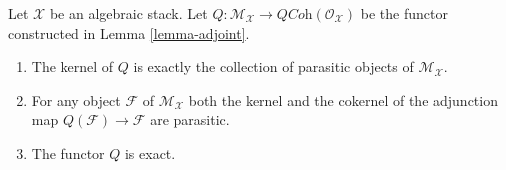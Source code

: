\begin{lemma}
\label{lemma-adjoint-kernel-parasitic}
Let $\mathcal{X}$ be an algebraic stack.
Let $Q : \mathcal{M}_\mathcal{X} \to \textit{QCoh}(\mathcal{O}_\mathcal{X})$
be the functor constructed in Lemma \ref{lemma-adjoint}.
\begin{enumerate}
\item The kernel of $Q$ is exactly the collection of parasitic objects
of $\mathcal{M}_\mathcal{X}$.
\item For any object $\mathcal{F}$
of $\mathcal{M}_\mathcal{X}$ both the kernel and the cokernel of the
adjunction map $Q(\mathcal{F}) \to \mathcal{F}$ are parasitic.
\item The functor $Q$ is exact.
\end{enumerate}
\end{lemma}

